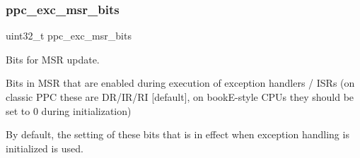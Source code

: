\subsubsection{\texorpdfstring{ppc\_exc\_msr\_bits}{ppc\_exc\_msr\_bits}}
{\footnotesize\ttfamily uint32\+\_\+t ppc\+\_\+exc\+\_\+msr\+\_\+bits}



Bits for M\+SR update. 

Bits in M\+SR that are enabled during execution of exception handlers / I\+S\+Rs (on classic P\+PC these are D\+R/\+I\+R/\+RI \mbox{[}default\mbox{]}, on book\+E-\/style C\+P\+Us they should be set to 0 during initialization)

By default, the setting of these bits that is in effect when exception handling is initialized is used. 